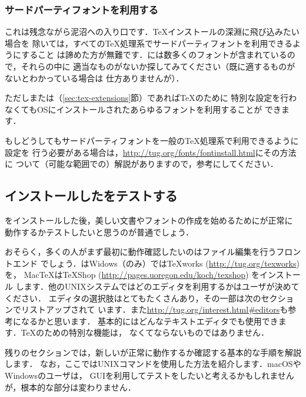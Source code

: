 \documentclass[uplatex,dvipdfmx]{jsarticle}
\begin{document}
\subsubsection{サードパーティフォントを利用する}

これは残念ながら泥沼への入り口です．\TeX インストールの深淵に飛び込みたい場合を
除いては，すべての\TeX 処理系でサードパーティフォントを利用できるようにすること
は諦めた方が無難です．\TL には数多くのフォントが含まれているので，それらの中に
適当なものがないか探してみてください（既に適するものがないとわかっている場合は
仕方ありませんが）．

ただし\XeTeX または\LuaTeX （\ref{sec:tex-extensions}節）であれば\TeX のために
特別な設定を行わなくてもOSにインストールされたあらゆるフォントを利用することが
できます．

もしどうしてもサードパーティフォントを一般の\TeX 処理系で利用できるように設定を
行う必要がある場合は，\url{http://tug.org/fonts/fontinstall.html}にその方法に
ついて（可能な範囲での）解説がありますので，参考にしてください．

\subsection{インストールした\TL をテストする}
\label{sec:test-install}

\TL をインストールした後，美しい文書やフォントの作成を始めるために\TL が正常に
動作するかテストしたいと思うのが普通でしょう．

おそらく，多くの人がまず最初に動作確認したいのはファイル編集を行うフロントエンド
でしょう．\TL はWidows（のみ）では{\TeX}works (\url{http://tug.org/texworks}) を，
Mac\TeX は{\TeX}Shop (\url{http://pages.uoregon.edu/koch/texshop}) をインストール
します．他のUNIXシステムではどのエディタを利用するかはユーザが決めてください．
エディタの選択肢はとてもたくさんあり，その一部は次のセクションでリストアップされて
います．また\url{http://tug.org/interest.html#editors}も参考になるかと思います．
基本的にはどんなテキストエディタでも使用できます．\TeX のための特別な機能は，
なくてならないものではありません．

残りのセクションでは，新しい\TL が正常に動作するか確認する基本的な手順を解説します．
なお，ここではUNIXコマンドを使用した方法を紹介します．macOSやWindowsのユーザは，
GUIを利用してテストをしたいと考えるかもしれませんが，根本的な部分は変わりません．
\end{document}
